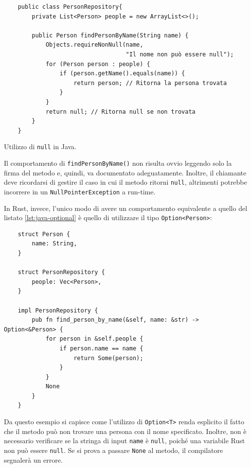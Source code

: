 \begin{listing}[h]
    \begin{verbatim}
    public class PersonRepository{
        private List<Person> people = new ArrayList<>();

        public Person findPersonByName(String name) {
            Objects.requireNonNull(name, 
                                   "Il nome non può essere null");
            for (Person person : people) {
                if (person.getName().equals(name)) {
                    return person; // Ritorna la persona trovata
                }
            }
            return null; // Ritorna null se non trovata
        }
    }
    \end{verbatim}
    \caption{Utilizzo di \texttt{null} in Java.}
    \label{lst:java-optional}
\end{listing}

Il comportamento di \texttt{findPersonByName()} non risulta ovvio leggendo solo la firma del metodo e, quindi, va documentato adeguatamente. Inoltre, il chiamante deve ricordarsi di gestire il caso in cui il metodo ritorni \texttt{null}, altrimenti potrebbe incorrere in un \texttt{NullPointerException} a run-time. 

In Rust, invece, l'unico modo di avere un comportamento equivalente a quello del listato \ref{lst:java-optional} è quello di utilizzare il tipo \texttt{Option<Person>}:
\begin{verbatim}
    struct Person {
        name: String,
    }

    struct PersonRepository {
        people: Vec<Person>,
    }

    impl PersonRepository {
        pub fn find_person_by_name(&self, name: &str) -> Option<&Person> {
            for person in &self.people {
                if person.name == name {
                    return Some(person); 
                }
            }
            None
        }
    }
\end{verbatim}
Da questo esempio si capisce come l'utilizzo di \texttt{Option<T>} renda esplicito il fatto che il metodo può non trovare una persona con il nome specificato. Inoltre, non è necessario verificare se la stringa di input \texttt{name} è \texttt{null}, poiché una variabile Rust non può essere \texttt{null}. Se si prova a passare \texttt{None} al metodo, il compilatore segnalerà un errore.

